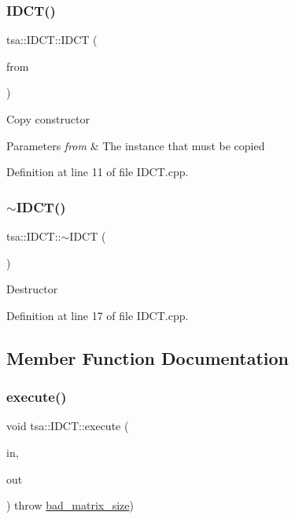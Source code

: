 \subsubsection{\texorpdfstring{I\+D\+C\+T()}{IDCT()}\hspace{0.1cm}{\footnotesize\ttfamily [2/2]}}
{\footnotesize\ttfamily tsa\+::\+I\+D\+C\+T\+::\+I\+D\+CT (\begin{DoxyParamCaption}\item[{const \hyperlink{classtsa_1_1_i_d_c_t}{I\+D\+CT} \&}]{from }\end{DoxyParamCaption})}

Copy constructor


\begin{DoxyParams}{Parameters}
{\em from} & The instance that must be copied \\
\hline
\end{DoxyParams}


Definition at line 11 of file I\+D\+C\+T.\+cpp.

\mbox{\label{classtsa_1_1_i_d_c_t_ae7caa3512626cc407690fc0b9f7eaafb}} 
\subsubsection{\texorpdfstring{$\sim$\+I\+D\+C\+T()}{~IDCT()}}
{\footnotesize\ttfamily tsa\+::\+I\+D\+C\+T\+::$\sim$\+I\+D\+CT (\begin{DoxyParamCaption}{ }\end{DoxyParamCaption})\hspace{0.3cm}{\ttfamily [virtual]}}

Destructor 

Definition at line 17 of file I\+D\+C\+T.\+cpp.



\subsection{Member Function Documentation}
\mbox{\label{classtsa_1_1_i_d_c_t_aef29c6eb84ce3367e90eb66b3e40c005}} 
\subsubsection{\texorpdfstring{execute()}{execute()}\hspace{0.1cm}{\footnotesize\ttfamily [1/2]}}
{\footnotesize\ttfamily void tsa\+::\+I\+D\+C\+T\+::execute (\begin{DoxyParamCaption}\item[{\hyperlink{namespacetsa_ad260cd21c1891c4ed391fe788569aba4}{Dmatrix} \&}]{in,  }\item[{\hyperlink{namespacetsa_ad260cd21c1891c4ed391fe788569aba4}{Dmatrix} \&}]{out }\end{DoxyParamCaption}) throw  \hyperlink{classtsa_1_1bad__matrix__size}{bad\+\_\+matrix\+\_\+size}) }

